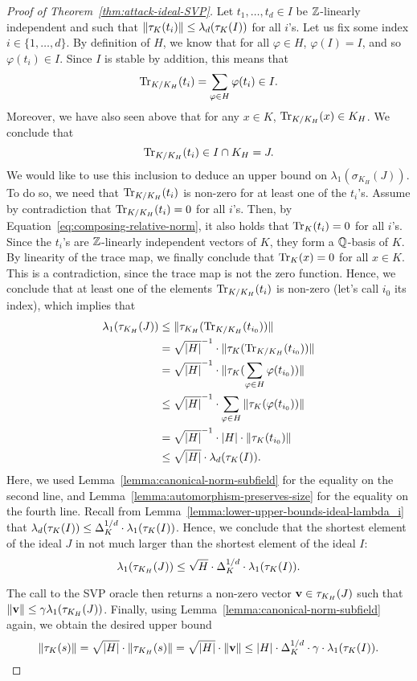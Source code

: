 \begin{proof}[Proof of Theorem~\ref{thm:attack-ideal-SVP}]
Let $t_1, \dots, t_d \in I$ be $\mathbb{Z}$-linearly independent and such that $\|\tau_K(t_i)\| \leq \lambda_d(\tau_K(I))$ for all $i$'s.
Let us fix some index $i \in \{1, \dots, d\}$.
By definition of $H$, we know that for all $\varphi \in H$, $\varphi(I) = I$, and so $\varphi(t_i) \in I$. Since $I$ is stable by addition, this means that 
\[\mathrm{Tr}_{K/K_H}(t_i) = \sum_{\varphi \in H} \varphi(t_i) \in I.\]
Moreover, we have also seen above that for any $x \in K$, $\mathrm{Tr}_{K/K_H}(x) \in K_H$. We conclude that 
\[\mathrm{Tr}_{K/K_H}(t_i) \in I \cap K_H = J.\]
We would like to use this inclusion to deduce an upper bound on $\lambda_1(\sigma_{K_H}(J))$. To do so, we need that $\mathrm{Tr}_{K/K_H}(t_i)$ is non-zero for at least one of the $t_i$'s. Assume by contradiction that $\mathrm{Tr}_{K/K_H}(t_i) = 0$ for all $i$'s. Then, by Equation~\eqref{eq:composing-relative-norm}, it also holds that $\mathrm{Tr}_{K}(t_i) = 0$ for all $i$'s. Since the $t_i$'s are $\mathbb{Z}$-linearly independent vectors of $K$, they form a $\mathbb{Q}$-basis of $K$. By linearity of the trace map, we finally conclude that $\mathrm{Tr}_K(x) = 0$ for all $x \in K$. This is a contradiction, since the trace map is not the zero function. Hence, we conclude that at least one of the elements $\mathrm{Tr}_{K/K_H}(t_i)$ is non-zero (let's call $i_0$ its index), which implies that
\begin{align*}
\lambda_1(\tau_{K_H}(J)) &\leq\|\tau_{K_H}(\mathrm{Tr}_{K/K_H}(t_{i_0}))\| \\
& = \sqrt{|H|}^{-1} \cdot \|\tau_{K}(\mathrm{Tr}_{K/K_H}(t_{i_0}))\| \\
& = \sqrt{|H|}^{-1} \cdot \|\tau_{K}(\sum_{\varphi \in H}\varphi(t_{i_0}))\| \\
& \leq \sqrt{|H|}^{-1} \cdot \sum_{\varphi \in H}\|\tau_{K}(\varphi(t_{i_0}))\| \\
& = \sqrt{|H|}^{-1} \cdot |H| \cdot \|\tau_{K}(t_{i_0})\| \\
& \leq \sqrt{|H|} \cdot \lambda_d(\tau_K(I)).
\end{align*}
Here, we used Lemma~\ref{lemma:canonical-norm-subfield} for the equality on the second line, and Lemma~\ref{lemma:automorphism-preserves-size} for the equality on the fourth line. Recall from Lemma~\ref{lemma:lower-upper-bounds-ideal-lambda_i} that $\lambda_d(\tau_K(I)) \leq \Delta_K^{1/d} \cdot \lambda_1(\tau_K(I))$. Hence, we conclude that the shortest element of the ideal $J$ in not much larger than the shortest element of the ideal $I$:
\[\lambda_1(\tau_{K_H}(J)) \leq \sqrt{H} \cdot \Delta_K^{1/d} \cdot \lambda_1(\tau_K(I)).\]

The call to the SVP oracle then returns a non-zero vector $\mathbf v \in \tau_{K_H}(J)$ such that $\|\mathbf v\| \leq \gamma \lambda_1(\tau_{K_H}(J))$. Finally, using Lemma~\ref{lemma:canonical-norm-subfield} again, we obtain the desired upper bound
\[ \|\tau_K(s)\| = \sqrt{|H|} \cdot \|\tau_{K_H}(s)\| = \sqrt{|H|} \cdot \|\mathbf v\| \leq |H| \cdot \Delta_K^{1/d} \cdot \gamma \cdot \lambda_1(\tau_K(I)).\]
\end{proof}

